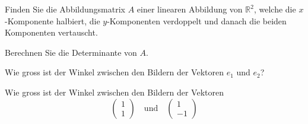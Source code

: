 Finden Sie die Abbildungsmatrix $A$ einer linearen Abbildung von $\mathbb R^2$,
welche die $x$-Komponente halbiert, die $y$-Komponenten verdoppelt und
danach die beiden Komponenten vertauscht.
\begin{teilaufgaben}
\item Berechnen Sie die Determinante von $A$.
\item Wie gross ist der Winkel zwischen den Bildern der Vektoren
$e_1$ und $e_2$?
\item Wie gross ist der Winkel zwischen den Bildern der Vektoren
\[
\begin{pmatrix}1\\1\end{pmatrix}\quad\text{und}\quad
\begin{pmatrix}1\\-1\end{pmatrix}
\]
\end{teilaufgaben}

